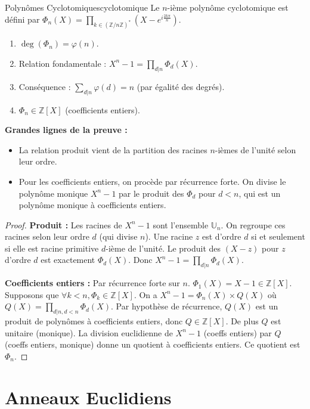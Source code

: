 \documentclass{prepacours}
\begin{document}
\begin{proposition}{Polynômes Cyclotomiques}{cyclotomique}
    Le $n$-ième polynôme cyclotomique est défini par $\Phi_n(X) = \prod_{k \in (\mathbb{Z}/n\mathbb{Z})^*} (X - e^{i \frac{2k\pi}{n}})$.
    \begin{enumerate}
        \item $\deg(\Phi_n) = \varphi(n)$.
        \item Relation fondamentale : $X^n - 1 = \prod_{d|n} \Phi_d(X)$.
        \item Conséquence : $\sum_{d|n} \varphi(d) = n$ (par égalité des degrés).
        \item $\Phi_n \in \mathbb{Z}[X]$ (coefficients entiers).
    \end{enumerate}
\end{proposition}

\noindent \textbf{Grandes lignes de la preuve :}
\begin{itemize}
    \item La relation produit vient de la partition des racines $n$-ièmes de l'unité selon leur ordre.
    \item Pour les coefficients entiers, on procède par récurrence forte. On divise le polynôme monique $X^n-1$ par le produit des $\Phi_d$ pour $d<n$, qui est un polynôme monique à coefficients entiers.
\end{itemize}

\begin{proof}
    \textbf{Produit :} Les racines de $X^n-1$ sont l'ensemble $\mathbb{U}_n$.
    On regroupe ces racines selon leur ordre $d$ (qui divise $n$).
    Une racine $z$ est d'ordre $d$ si et seulement si elle est racine primitive $d$-ième de l'unité.
    Le produit des $(X-z)$ pour $z$ d'ordre $d$ est exactement $\Phi_d(X)$.
    Donc $X^n - 1 = \prod_{d|n} \Phi_d(X)$.
    
    \textbf{Coefficients entiers :}
    Par récurrence forte sur $n$.
    $\Phi_1(X) = X-1 \in \mathbb{Z}[X]$.
    Supposons que $\forall k < n, \Phi_k \in \mathbb{Z}[X]$.
    On a $X^n - 1 = \Phi_n(X) \times Q(X)$ où $Q(X) = \prod_{d|n, d<n} \Phi_d(X)$.
    Par hypothèse de récurrence, $Q(X)$ est un produit de polynômes à coefficients entiers, donc $Q \in \mathbb{Z}[X]$. De plus $Q$ est unitaire (monique).
    La division euclidienne de $X^n-1$ (coeffs entiers) par $Q$ (coeffs entiers, monique) donne un quotient à coefficients entiers. Ce quotient est $\Phi_n$.
\end{proof}

\section{Anneaux Euclidiens}
\end{document}
